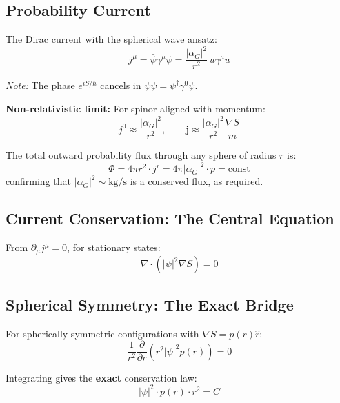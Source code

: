 \documentclass[11pt,a4paper]{article}
\theoremstyle{definition}
\theoremstyle{remark}
\begin{document}
	\subsection{Probability Current}
	
	The Dirac current with the spherical wave ansatz:
	\begin{equation}
		j^\mu = \bar{\psi}\gamma^\mu\psi = \frac{|\alpha_G|^2}{r^2}\,\bar{u}\gamma^\mu u
		\label{eq:current}
	\end{equation}
	
	\textit{Note:} The phase $e^{iS/\hbar}$ cancels in $\bar{\psi}\psi = \psi^\dagger\gamma^0\psi$.
	
	\textbf{Non-relativistic limit:} For spinor aligned with momentum:
	\begin{equation}
		j^0 \approx \frac{|\alpha_G|^2}{r^2}, \qquad \mathbf{j} \approx \frac{|\alpha_G|^2}{r^2}\frac{\nabla S}{m}
		\label{eq:current_NR}
	\end{equation}
	
	The total outward probability flux through any sphere of radius $r$ is:
	\begin{equation}
		\Phi = 4\pi r^2 \cdot j^r = 4\pi|\alpha_G|^2 \cdot p = \text{const}
	\end{equation}
	confirming that $|\alpha_G|^2 \sim \text{kg/s}$ is a conserved flux, as required.
	
	\subsection{Current Conservation: The Central Equation}
	
	From $\partial_\mu j^\mu = 0$, for stationary states:
	\begin{equation}
		\boxed{\nabla\cdot\!\left(|\psi|^2\nabla S\right) = 0}
		\label{eq:continuity}
	\end{equation}
	
	\subsection{Spherical Symmetry: The Exact Bridge}
	
	For spherically symmetric configurations with $\nabla S = p(r)\hat{r}$:
	\begin{equation}
		\frac{1}{r^2}\frac{\partial}{\partial r}\!\left(r^2|\psi|^2 p(r)\right) = 0
	\end{equation}
	
	Integrating gives the \textbf{exact} conservation law:
	\begin{equation}
		\boxed{|\psi|^2 \cdot p(r) \cdot r^2 = C}
		\label{eq:exact_bridge}
	\end{equation}
	
\end{document}
